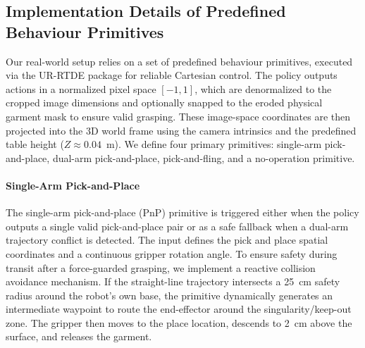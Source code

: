 \documentclass[journal]{IEEEtran}
\begin{document}
\subsection{Implementation Details of Predefined Behaviour Primitives} \label{sec:real-world-primitives}

Our real-world setup relies on a set of predefined behaviour primitives, executed via the UR-RTDE package for reliable Cartesian control. The policy outputs actions in a normalized pixel space $[-1, 1]$, which are denormalized to the cropped image dimensions and optionally snapped to the eroded physical garment mask to ensure valid grasping. These image-space coordinates are then projected into the 3D world frame using the camera intrinsics and the predefined table height ($Z \approx 0.04$~m). We define four primary primitives: single-arm pick-and-place, dual-arm pick-and-place, pick-and-fling, and a no-operation primitive.

\paragraph{Single-Arm Pick-and-Place} The single-arm pick-and-place (PnP) primitive is triggered either when the policy outputs a single valid pick-and-place pair or as a safe fallback when a dual-arm trajectory conflict is detected. The input defines the pick and place spatial coordinates and a continuous gripper rotation angle. To ensure safety during transit after a force-guarded grasping, we implement a reactive collision avoidance mechanism. If the straight-line trajectory intersects a 25~cm safety radius around the robot's own base, the primitive dynamically generates an intermediate waypoint to route the end-effector around the singularity/keep-out zone. The gripper then moves to the place location, descends to 2~cm above the surface, and releases the garment.
\end{document}
